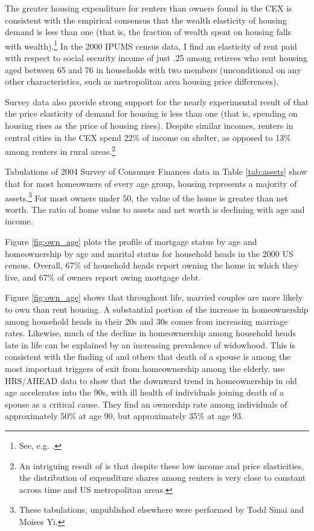 \documentclass[12pt]{article}
\begin{document}
The greater housing expenditure for renters than owners found in the CEX 
is consistent with the empirical consensus that the wealth elasticity of housing
demand is less than one (that is, the fraction of wealth spent on housing falls
with wealth).\footnote{See, e.g. \citet{Carliner}.}  In the 2000 IPUMS census
data, I find an elasticity of rent paid with respect to social security income
of just .25 among retirees who rent housing aged between 65 and 76 in households
with two members (unconditional on any other characteristics, such as
metropolitan area housing price differences).

Survey data also provide strong support for the nearly experimental result of
\citet{HanushekQuigley} that the price elasticity of demand for housing is less
than one (that is, spending on housing rises as the price of housing rises).
Despite similar incomes, renters in central cities in the CEX spend 22\% of
income on shelter, as opposed to 13\% among renters in rural areas.\footnote{An
intriguing result of \citet{DavisFOM} is that despite these low income and price
elasticities, the distribution of expenditure shares among renters is very close
to constant across time and US metropolitan areas.}

Tabulations of 2004 Survey of Consumer Finances data in Table \ref{tab:assets}
show that for most homeowners of every age group, housing represents a majority
of assets.\footnote{These tabulations, unpublished elsewhere were performed by
Todd Sinai and Moises Yi.}  For most owners under 50, the value of the home is
greater than net worth.  The ratio of home value to assets and net worth is
declining with age and income.

Figure \ref{fig:own_age} plots the profile of mortgage status by age and
homeownership by age and marital status for household heads in the 2000 US
census.  Overall, 67\% of household heads report owning the home in which they
live, and 67\% of owners report owing mortgage debt.  

Figure \ref{fig:own_age} shows that throughout life, married couples are more
likely to own than rent housing.  A substantial portion of the increase in
homeownership among household heads in their 20s and 30s comes from increasing
marriage rates.  Likewise, much of the decline in homeownership among household
heads late in life can be explained by an increasing prevalence of widowhood.
This is consistent with the finding of \citet{VentiWise} and others that death
of a spouse is among the most important triggers of exit from homeownership
among the elderly.  \citet{CoileMilligan} use HRS/AHEAD data to show that the
downward trend in homeownership in old age accelerates into the 90s, with ill
health of individuals joining death of a spouse as a critical cause.  They find
an ownership rate among individuals of approximately 50\% at age 90, but
approximately 35\% at age 93.
\end{document}
